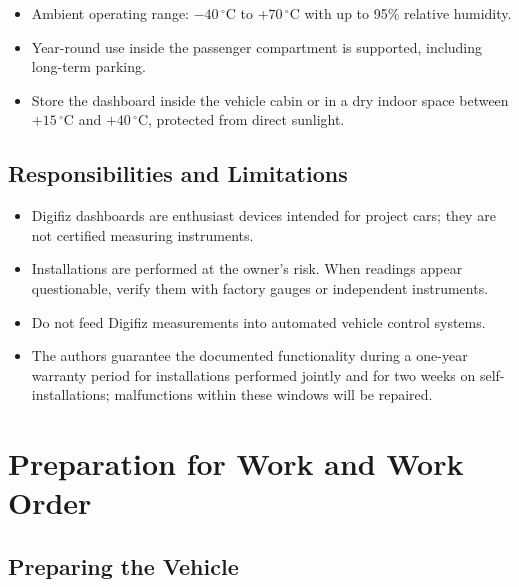 \begin{itemize}
    \item Ambient operating range: \(-40\,^{\circ}\mathrm{C}\) to \(+70\,^{\circ}\mathrm{C}\) with up to 95\% relative humidity.
    \item Year-round use inside the passenger compartment is supported, including long-term parking.
    \item Store the dashboard inside the vehicle cabin or in a dry indoor space between \(+15\,^{\circ}\mathrm{C}\) and \(+40\,^{\circ}\mathrm{C}\), protected from direct sunlight.
\end{itemize}

\section{Responsibilities and Limitations}

\begin{itemize}
    \item Digifiz dashboards are enthusiast devices intended for project cars; they are not certified measuring instruments.
    \item Installations are performed at the owner's risk.
          When readings appear questionable, verify them with factory gauges or independent instruments.
    \item Do not feed Digifiz measurements into automated vehicle control systems.
    \item The authors guarantee the documented functionality during a one-year warranty period for installations performed jointly and for two weeks on self-installations; malfunctions within these windows will be repaired.
\end{itemize}

\chapter{Preparation for Work and Work Order} \label{ch:preparation}

\section{Preparing the Vehicle}

